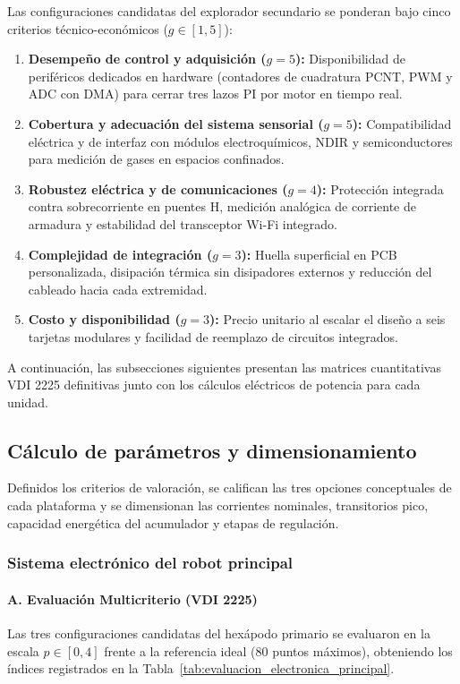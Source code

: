 Las configuraciones candidatas del explorador secundario se ponderan bajo cinco criterios técnico-económicos ($g \in [1,5]$):

\begin{enumerate}
    \item \textbf{Desempeño de control y adquisición ($g = 5$):} Disponibilidad de periféricos dedicados en hardware (contadores de cuadratura PCNT, PWM y ADC con DMA) para cerrar tres lazos PI por motor en tiempo real.
    \item \textbf{Cobertura y adecuación del sistema sensorial ($g = 5$):} Compatibilidad eléctrica y de interfaz con módulos electroquímicos, NDIR y semiconductores para medición de gases en espacios confinados.
    \item \textbf{Robustez eléctrica y de comunicaciones ($g = 4$):} Protección integrada contra sobrecorriente en puentes H, medición analógica de corriente de armadura y estabilidad del transceptor Wi-Fi integrado.
    \item \textbf{Complejidad de integración ($g = 3$):} Huella superficial en PCB personalizada, disipación térmica sin disipadores externos y reducción del cableado hacia cada extremidad.
    \item \textbf{Costo y disponibilidad ($g = 3$):} Precio unitario al escalar el diseño a seis tarjetas modulares y facilidad de reemplazo de circuitos integrados.
\end{enumerate}

A continuación, las subsecciones siguientes presentan las matrices cuantitativas VDI 2225 definitivas junto con los cálculos eléctricos de potencia para cada unidad.

\subsection{Cálculo de parámetros y dimensionamiento}

Definidos los criterios de valoración, se califican las tres opciones conceptuales de cada plataforma y se dimensionan las corrientes nominales, transitorios pico, capacidad energética del acumulador y etapas de regulación.

\subsubsection{Sistema electrónico del robot principal}

\paragraph{A. Evaluación Multicriterio (VDI 2225)}
Las tres configuraciones candidatas del hexápodo primario se evaluaron en la escala $p \in [0,4]$ frente a la referencia ideal ($80$ puntos máximos), obteniendo los índices registrados en la Tabla~\ref{tab:evaluacion_electronica_principal}.

